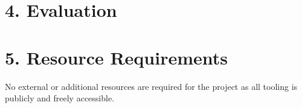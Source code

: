 \documentclass[11pt, a4paper, twoside, openright]{report}
\begin{document}
\section*{4. Evaluation}

\section*{5. Resource Requirements}

No external or additional resources are required for the project as all tooling is publicly and freely accessible.

\backmatter

%


\end{document}
